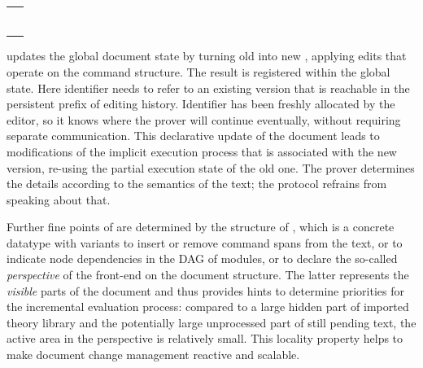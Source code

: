 \begin{isabellebody}
\begin{isamarkuptext}
  \medskip
  \begin{tabular}{l}
  \isa{Document{\isachardot}init{\isacharcolon}\ Document{\isachardot}state} \\
  \isa{Document{\isachardot}update{\isacharcolon}\ version{\isacharunderscore}id\ {\isasymrightarrow}\ version{\isacharunderscore}id\ {\isasymrightarrow}\ edit\isactrlsup {\isacharasterisk}\ {\isasymrightarrow}\ Document{\isachardot}state\ {\isasymrightarrow}\ Document{\isachardot}state} \\
  \isa{Document{\isachardot}remove{\isacharunderscore}versions{\isacharcolon}\ version{\isacharunderscore}id\isactrlbsup {\isacharasterisk}\isactrlesup \ {\isasymrightarrow}\ Document{\isachardot}state\ {\isasymrightarrow}\ Document{\isachardot}state} \
  \end{tabular}
  \medskip

   updates the global document
  state by turning old \isa{v\isactrlsub {\isadigit{1}}} into new \isa{v\isactrlsub {\isadigit{2}}}, applying
  edits that operate on the command structure.  The result is
  registered within the global state.  Here identifier 
  needs to refer to an existing version that is reachable in the
  persistent prefix of editing history.  Identifier  has
  been freshly allocated by the editor, so it knows where the prover
  will continue eventually, without requiring separate communication.
  This declarative update of the document leads to modifications of
  the implicit execution process that is associated with the new
  version, re-using the partial execution state of the old one.  The
  prover determines the details according to the semantics of the
  text; the protocol refrains from speaking about that.

  Further fine points of  are determined by the
  structure of \isa{edit}, which is a concrete datatype with
  variants to insert or remove command spans from the text, or to
  indicate node dependencies in the DAG of modules, or to declare the
  so-called \emph{perspective} of the front-end on the document
  structure.  The latter represents the \emph{visible} parts of the
  document and thus provides hints to determine priorities for the
  incremental evaluation process: compared to a large hidden part of
  imported theory library and the potentially large unprocessed part
  of still pending text, the active area in the perspective is
  relatively small.  This locality property helps to make document
  change management reactive and scalable.


\end{isamarkuptext}
\end{isabellebody}
